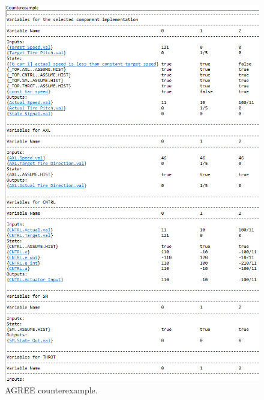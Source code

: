 \begin{figure}[h] 
	\centering 
	\includegraphics[width=\columnwidth]{cex.png}
	\caption{AGREE counterexample.}
	\label{fig:cex} 
\end{figure}



